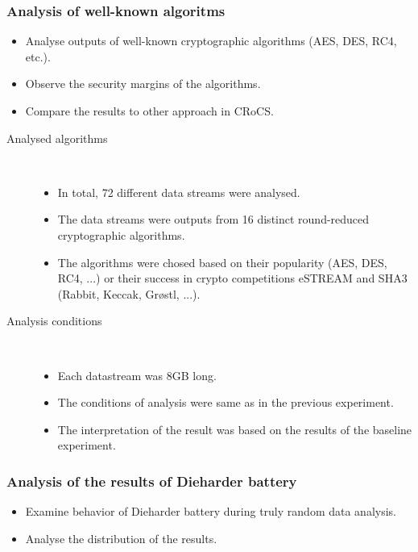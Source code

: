 \documentclass[aspectratio=169]{beamer}
\begin{document}
\begin{frame}
\frametitle{Analysis of well-known algoritms}
\begin{itemize}
\item Analyse outputs of well-known cryptographic algorithms (AES, DES, RC4, etc.).
\item Observe the security margins of the algorithms.
\item Compare the results to other approach in CRoCS.
\end{itemize}

\begin{description}
\item[Analysed algorithms] \hfill \\
\begin{itemize}
\item In total, 72 different data streams were analysed.
\item The data streams were outputs from 16 distinct round-reduced cryptographic algorithms.
\item The algorithms were chosed based on their popularity (AES, DES, RC4, ...) or their success in crypto competitions eSTREAM and SHA3 (Rabbit, Keccak, Gr\o stl, ...).
\end{itemize}
\vspace{.2cm}
\item[Analysis conditions] \hfill \\
\begin{itemize}
\item Each datastream was 8GB long.
\item The conditions of analysis were same as in the previous experiment.
\item The interpretation of the result was based on the results of the baseline experiment.
\end{itemize}
\end{description}

\end{frame}

\begin{frame}
\frametitle{Analysis of the results of Dieharder battery}
\begin{itemize}
\item Examine behavior of Dieharder battery during truly random data analysis.
\item Analyse the distribution of the results.
\end{itemize}
\end{frame}
\end{document}
